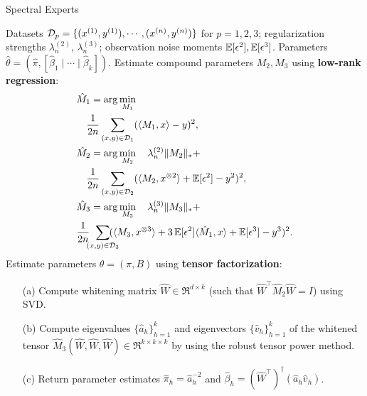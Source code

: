 \begin{algorithm}[t]
  \caption{Spectral Experts}
  \label{algo:spectral-experts}
  \begin{algorithmic}[1]
    \INPUT Datasets $\mathcal{D}_p = \{ (x^{(1)}, y^{(1)}), \cdots, (x^{(n)}, y^{(n)}) \}$ for $p = 1, 2, 3$;
    regularization strengths $\lambda_n^{(2)}$, $\lambda_n^{(3)}$;
    observation noise moments $\operatorname{\mathbb{E}}[\epsilon^2], \operatorname{\mathbb{E}}[\epsilon^3]$.
    \OUTPUT Parameters $\hat\theta = (\hat \pi, [\hat \beta_1 \mid \cdots \mid \hat \beta_k])$.
    \STATE Estimate compound parameters $M_2, M_3$ using \textbf{low-rank regression}:
    \begin{align}
      &\hat M_1 = \arg\min_{M_1} \label{eqn:estimateM1} \\
      &\quad\frac{1}{2n}\sum_{(x,y) \in \mathcal{D}_1} (\langle M_1, x \rangle - y)^2, \nonumber \\
      &\hat M_2 = \arg\min_{M_2} \quad \lambda_n^{(2)} \|M_2\|_* + \label{eqn:estimateM2} \\
      &\quad\frac{1}{2n}\sum_{(x,y) \in \mathcal{D}_2} (\langle M_2, x^{\otimes 2} \rangle + \operatorname{\mathbb{E}}[\epsilon^2] - y^2)^2, \nonumber \\
      &\hat M_3 = \arg\min_{M_3} \quad \lambda_n^{(3)} \|M_3\|_* + \label{eqn:estimateM3} \\
      &{\frac{1}{2n} \hspace{-0.5em}\sum_{(x,y) \in \mathcal{D}_3} \hspace{-1em}(\langle M_3, x^{\otimes 3} \rangle + 3 \operatorname{\mathbb{E}}[\epsilon^2]\langle \hat M_1, x \rangle + \operatorname{\mathbb{E}}[\epsilon^3] - y^3)^2}. \nonumber
    \end{align}
    \STATE Estimate parameters $\theta = (\pi, B)$ using \textbf{tensor factorization}:
    \begin{enumerate}
      \item [(a)] Compute whitening matrix $\hat W \in \Re^{d \times k}$ (such that $\hat W^\top
      \hat M_2 \hat W = I$) using SVD.
      \item [(b)] Compute eigenvalues $\{\hat a_h\}_{h=1}^k$
      and eigenvectors $\{\hat v_h\}_{h=1}^k$
      of the whitened tensor $\hat M_3(\hat W, \hat W, \hat W) \in \Re^{k \times k \times k}$
      by using the robust tensor power method.
    \item [(c)] Return parameter estimates $\hat\pi_h = \hat a_h^{-2}$
    and $\hat\beta_h = (\hat W^{\top})^\dagger (\hat a_h \hat v_h)$.
    \end{enumerate}
  \end{algorithmic}
\end{algorithm}


